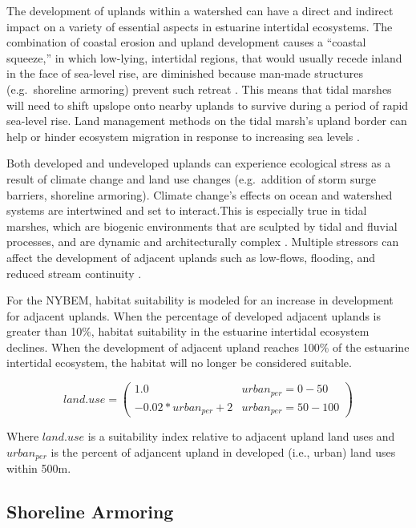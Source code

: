 \documentclass[
]{book}
\begin{document}
The development of uplands within a watershed can have a direct and indirect impact on a variety of essential aspects in estuarine intertidal ecosystems. The combination of coastal erosion and upland development causes a ``coastal squeeze,'' in which low-lying, intertidal regions, that would usually recede inland in the face of sea-level rise, are diminished because man-made structures (e.g.~shoreline armoring) prevent such retreat \citep{prosser_impacts_2018}. This means that tidal marshes will need to shift upslope onto nearby uplands to survive during a period of rapid sea-level rise. Land management methods on the tidal marsh's upland border can help or hinder ecosystem migration in response to increasing sea levels \citep{anisfeld_upslope_2017}.

Both developed and undeveloped uplands can experience ecological stress as a result of climate change and land use changes (e.g.~addition of storm surge barriers, shoreline armoring). Climate change's effects on ocean and watershed systems are intertwined and set to interact.This is especially true in tidal marshes, which are biogenic environments that are sculpted by tidal and fluvial processes, and are dynamic and architecturally complex \citep{colombano_climate_2021}. Multiple stressors can affect the development of adjacent uplands such as low-flows, flooding, and reduced stream continuity \citep{talke_changing_2020}.

For the NYBEM, habitat suitability is modeled for an increase in development for adjacent uplands. When the percentage of developed adjacent uplands is greater than 10\%, habitat suitability in the estuarine intertidal ecosystem declines. When the development of adjacent upland reaches 100\% of the estuarine intertidal ecosystem, the habitat will no longer be considered suitable.

\[land.use = \begin{pmatrix} 1.0 & urban_{per}=0-50\\
-0.02*urban_{per}+2 & urban_{per}=50-100
\end{pmatrix}\]

Where \(land.use\) is a suitability index relative to adjacent upland land uses and \(urban_{per}\) is the percent of adjancent upland in developed (i.e., urban) land uses within 500m.

\hypertarget{shoreline-armoring}{%
\subsection{Shoreline Armoring}\label{shoreline-armoring}}
\end{document}

